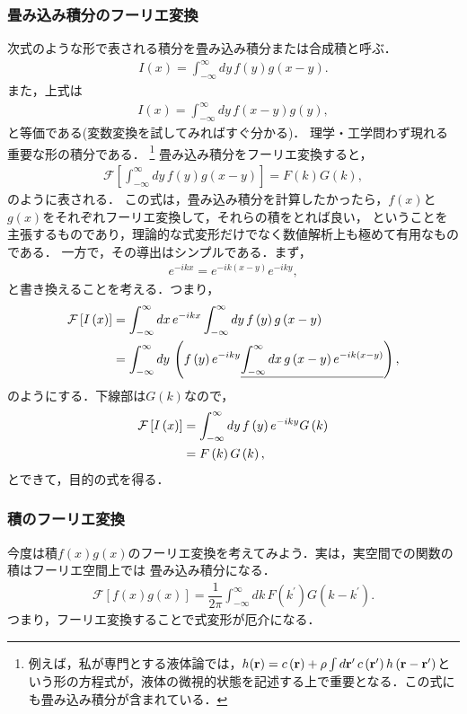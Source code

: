 \subsubsection{畳み込み積分のフーリエ変換}
%
次式のような形で表される積分を畳み込み積分または合成積と呼ぶ．
\begin{align}
 I\left(x\right) = \int_{-\infty}^{\infty}dy\,f\left(y\right)g\left(x-y\right). 
\end{align}
また，上式は
\begin{align}
 I\left(x\right) = \int_{-\infty}^{\infty}dy\,f\left(x-y\right)g\left(y\right),
\end{align}
と等価である(変数変換を試してみればすぐ分かる)．
%
理学・工学問わず現れる重要な形の積分である．
\footnote{例えば，私が専門とする液体論では，$h({\bf r}) = c\left({\bf r}\right) + \rho \int d{\bf r}^{\prime}\,c\left({\bf r}^{\prime}\right)h\left({\bf r}-{\bf r}^{\prime}\right)$という形の方程式が，液体の微視的状態を記述する上で重要となる．この式にも畳み込み積分が含まれている．}
%
畳み込み積分をフーリエ変換すると，
%
\begin{align}
 \mathcal{F}\left[\int_{-\infty}^{\infty}dy\,f\left(y\right)g\left(x-y\right)\right] = F\left(k\right)G\left(k\right),
\end{align}
%
のように表される．
この式は，畳み込み積分を計算したかったら，$f(x)$と$g(x)$をそれぞれフーリエ変換して，それらの積をとれば良い，
ということを主張するものであり，理論的な式変形だけでなく数値解析上も極めて有用なものである．
一方で，その導出はシンプルである．まず，
\begin{align}
 e^{-ikx} = e^{-ik\left(x-y\right)}e^{-iky}, 
\end{align}
%
と書き換えることを考える．つまり，
%
\begin{align}
 \mathcal{F}\left[I\left(x\right)\right]
 &= \int_{-\infty}^{\infty}dx\,e^{-ikx}\int_{-\infty}^{\infty}dy\,f\left(y\right)g\left(x-y\right) \notag \\
 &= \int_{-\infty}^{\infty}dy\,\left(f\left(y\right)e^{-iky} \underline{\int_{-\infty}^{\infty}dx\,g\left(x-y\right)e^{-ik\left(x-y\right)}}\right),
\end{align}
%
のようにする．下線部は$G\left(k\right)$なので，
\begin{align}
 \mathcal{F}\left[I\left(x\right)\right] 
 &= \int_{-\infty}^{\infty}dy\,f\left(y\right)e^{-iky}G\left(k\right)\notag \\
 &= F\left(k\right)G\left(k\right),
\end{align}
とできて，目的の式を得る．
%
%
\subsubsection{積のフーリエ変換}
%
今度は積$f(x)g(x)$のフーリエ変換を考えてみよう．実は，実空間での関数の積はフーリエ空間上では
畳み込み積分になる．
%
\begin{align}
 \mathcal{F}\left[f\left(x\right)g\left(x\right)\right] = \dfrac{1}{2\pi}\int_{-\infty}^{\infty}dk\, 
              F\left(k^{\prime}\right) G\left(k-k^{\prime}\right). 
\end{align}
つまり，フーリエ変換することで式変形が厄介になる．

